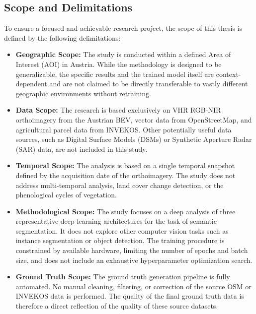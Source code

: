 \documentclass{report}
\begin{document}
\subsection{Scope and Delimitations}
To ensure a focused and achievable research project, the scope of this thesis is defined by the following delimitations:
\begin{itemize}
\item \textbf{Geographic Scope:} The study is conducted within a defined Area of Interest (AOI) in Austria. While the methodology is designed to be generalizable, the specific results and the trained model itself are context-dependent and are not claimed to be directly transferable to vastly different geographic environments without retraining.
\item \textbf{Data Scope:} The research is based exclusively on VHR RGB-NIR orthoimagery from the Austrian BEV, vector data from OpenStreetMap, and agricultural parcel data from INVEKOS. Other potentially useful data sources, such as Digital Surface Models (DSMs) or Synthetic Aperture Radar (SAR) data, are not included in this study.
\item \textbf{Temporal Scope:} The analysis is based on a single temporal snapshot defined by the acquisition date of the orthoimagery. The study does not address multi-temporal analysis, land cover change detection, or the phenological cycles of vegetation.
\item \textbf{Methodological Scope:} The study focuses on a deep analysis of three representative deep learning architectures for the task of semantic segmentation. It does not explore other computer vision tasks such as instance segmentation or object detection. The training procedure is constrained by available hardware, limiting the number of epochs and batch size, and does not include an exhaustive hyperparameter optimization search.
\item \textbf{Ground Truth Scope:} The ground truth generation pipeline is fully automated. No manual cleaning, filtering, or correction of the source OSM or INVEKOS data is performed. The quality of the final ground truth data is therefore a direct reflection of the quality of these source datasets.
\end{itemize}
\end{document}
